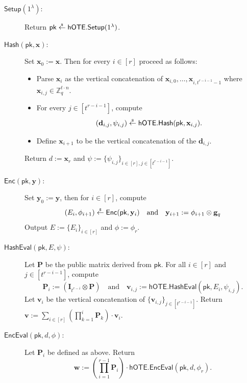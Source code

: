 \documentclass{article}
\newcommand{\getsr}{\overset{\raisebox{-1pt}{$\scriptscriptstyle \$$}}{\gets}}
\newcommand{\sample}{\getsr}
\newcommand{\BOTE}{\mathsf{hOTE}}
\newcommand{\Z}{\mathbb{Z}}
\renewcommand{\sec}{\ensuremath{\lambda}}
\newcommand{\secpar}{\sec}
\newcommand{\algofont}[1]{\ensuremath{\mathsf{#1}}}
\newcommand{\Enc}{{\algofont{Enc}}}
\newcommand{\Setup}{{\algofont{Setup}}}
\newcommand{\Eval}{\algofont{Eval}\xspace}
\newcommand{\Hash}{{\algofont{Hash}}}
\newcommand{\id}{\ensuremath{\mathbf{I}}}
\newcommand{\pk}{{\mathsf{pk}}}
\newcommand\bbbone{1}
\newenvironment{protocol}[1][]
{\begin{algorithm}\caption{#1}}
  {\end{algorithm}}
\begin{document}
\begin{protocol}[Fully Succinct NI-OTE]\label{prot:SOTE}

\begin{description}
\item[$\Setup(1^\secpar)$:] Return $\pk\sample\BOTE.\Setup(\bbbone^\sec)$.

\item[$\Hash(\pk, \mathbf{x})$:] Set $\mathbf{x}_0 := \mathbf{x}$. Then for every $i\in[r]$ proceed as follows:
\begin{itemize}
    \item Parse $\mathbf{x}_i$ as the vertical concatenation of $\mathbf{x}_{i,0},\dots, \mathbf{x}_{i,t^{r-i-1}-1}$ where $\mathbf{x}_{i,j}\in\Z_q^{t\cdot n}$.
    \item For every $j\in[t^{r-i-1}]$, compute 
    \[
    (\mathbf{d}_{i,j}, \psi_{i,j})\sample \BOTE.\Hash(\pk, \mathbf{x}_{i,j}).
    \]
    \item Define $\mathbf{x}_{i+1}$ to be the vertical concatenation of the $\mathbf{d}_{i,j}$.
\end{itemize}
Return $d:=\mathbf{x}_r$ and $\psi:=\{\psi_{i,j}\}_{i\in[r], j\in[t^{r-i-1}]}$.


\item[$\Enc(\pk, \mathbf{y})$:] Set $\mathbf{y}_0 := \mathbf{y}$, then for $i \in [r]$, compute
\[
(E_i, \phi_{i+1})\sample\Enc(\pk, \mathbf{y}_i) \quad\text{and}\quad \mathbf{y}_{i+1}:= \phi_{i+1}\otimes \mathbf{g}_q
\]
Output $E:=\{E_i\}_{i\in[r]}$ and $\phi:=\phi_r$. 

\item[$\Hash\Eval(\pk, E, \psi)$:] Let $\mathbf{P}$ be the public matrix derived from $\pk$. For all $i\in[r]$ and $j\in [t^{r-i-1}]$, compute
\[
\mathbf{P}_i:= (\id_{t^{r-i}}\otimes \mathbf{P})\quad\text{and}\quad
\mathbf{v}_{i,j}:= \BOTE.\Hash\Eval(\pk, E_i, \psi_{i,j}).
\]
Let $\mathbf{v}_i$ be the vertical concatenation of $\{\mathbf{v}_{i,j}\}_{j\in[t^{r-i-1}]}$. Return 
$\mathbf{v}:=\sum_{i\in[r]} \left(\prod_{k=1}^{i} \mathbf{P}_k\right)\cdot \mathbf{v}_i$.

\item[$\Enc\Eval(\pk, d, \phi)$:] Let $\mathbf{P}_i$ be defined as above. Return  
\[\mathbf{w}:=  \left(\prod_{i=1}^{r-1}\mathbf{P}_{i}\right)\cdot \BOTE.\Enc\Eval(\pk, d, \phi_r).\]
\end{description}
\end{protocol}
\end{document}
